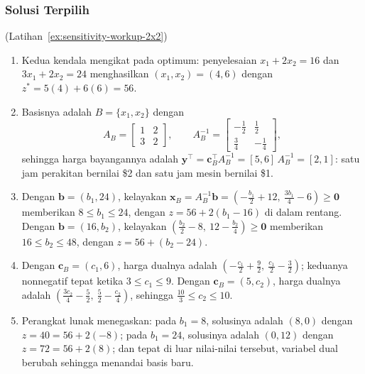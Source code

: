 \subsubsection*{Solusi Terpilih}

\begin{solution}(Latihan~\ref{ex:sensitivity-workup-2x2})
\begin{enumerate}
\item Kedua kendala mengikat pada optimum: penyelesaian $x_1 + 2x_2 = 16$ dan $3x_1 + 2x_2 = 24$ menghasilkan $(x_1, x_2) = (4, 6)$ dengan $z^* = 5(4) + 6(6) = 56$.
\item Basisnya adalah $B = \{x_1, x_2\}$ dengan
\[
A_B = \begin{bmatrix} 1 & 2 \\ 3 & 2 \end{bmatrix}, \qquad
A_B^{-1} = \begin{bmatrix} -\tfrac12 & \tfrac12 \\[2pt] \tfrac34 & -\tfrac14 \end{bmatrix},
\]
sehingga harga bayangannya adalah $\mathbf{y}^\top = \mathbf{c}_B^\top A_B^{-1} = [5, 6]\,A_B^{-1} = [2, 1]$: satu jam perakitan bernilai \$2 dan satu jam mesin bernilai \$1.
\item Dengan $\mathbf{b} = (b_1, 24)$, kelayakan $\mathbf{x}_B = A_B^{-1}\mathbf{b} = \left(-\tfrac{b_1}{2} + 12,\ \tfrac{3b_1}{4} - 6\right) \geq \mathbf{0}$ memberikan $8 \leq b_1 \leq 24$, dengan $z = 56 + 2(b_1 - 16)$ di dalam rentang. Dengan $\mathbf{b} = (16, b_2)$, kelayakan $\left(\tfrac{b_2}{2} - 8,\ 12 - \tfrac{b_2}{4}\right) \geq \mathbf{0}$ memberikan $16 \leq b_2 \leq 48$, dengan $z = 56 + (b_2 - 24)$.
\item Dengan $\mathbf{c}_B = (c_1, 6)$, harga dualnya adalah $\left(-\tfrac{c_1}{2} + \tfrac92,\ \tfrac{c_1}{2} - \tfrac32\right)$; keduanya nonnegatif tepat ketika $3 \leq c_1 \leq 9$. Dengan $\mathbf{c}_B = (5, c_2)$, harga dualnya adalah $\left(\tfrac{3c_2}{4} - \tfrac52,\ \tfrac52 - \tfrac{c_2}{4}\right)$, sehingga $\tfrac{10}{3} \leq c_2 \leq 10$.
\item Perangkat lunak menegaskan: pada $b_1 = 8$, solusinya adalah $(8,0)$ dengan $z = 40 = 56 + 2(-8)$; pada $b_1 = 24$, solusinya adalah $(0,12)$ dengan $z = 72 = 56 + 2(8)$; dan tepat di luar nilai-nilai tersebut, variabel dual berubah sehingga menandai basis baru.
\end{enumerate}
\end{solution}

